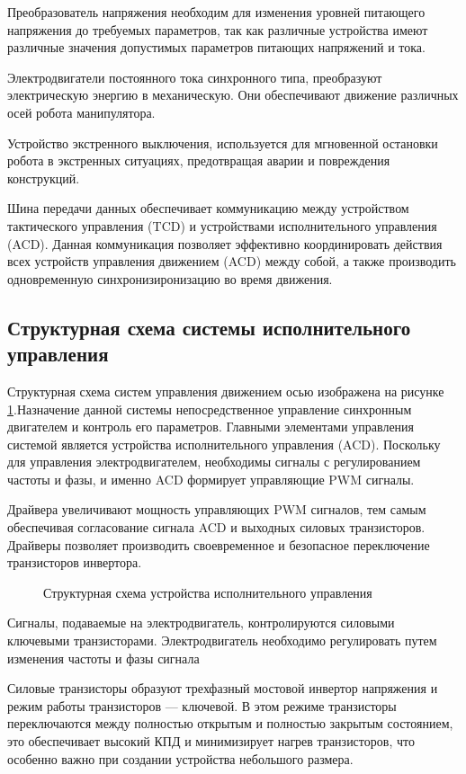 Преобразователь напряжения необходим для изменения уровней питающего напряжения до требуемых параметров, так как различные устройства имеют различные значения допустимых параметров питающих напряжений и тока.

Электродвигатели постоянного тока синхронного типа, преобразуют электрическую энергию в механическую. Они обеспечивают движение различных осей робота манипулятора.

Устройство экстренного выключения, используется для мгновенной остановки робота в экстренных ситуациях, предотвращая аварии и повреждения конструкций.

Шина передачи данных обеспечивает коммуникацию между устройством тактического управления (TCD) и устройствами исполнительного управления (ACD). Данная коммуникация позволяет эффективно координировать действия всех устройств управления движением (ACD) между собой, а также производить одновременную синхронизиронизацию во время движения.

\subsection{Структурная схема системы исполнительного управления}

Структурная схема систем управления движением осью изображена на рисунке \ref{ACD}.Назначение данной системы непосредственное управление синхронным двигателем и контроль его параметров. Главными элементами управления системой является устройства исполнительного управления (ACD). Поскольку для управления электродвигателем, необходимы сигналы с регулированием частоты и фазы, и именно   ACD формирует управляющие PWM сигналы.

Драйвера увеличивают мощность управляющих PWM сигналов, тем самым обеспечивая согласование сигнала ACD и выходных силовых транзисторов. Драйверы позволяет производить своевременное и безопасное переключение транзисторов инвертора. 

\begin{figure}[H]
	\centering
	
	\caption{Структурная схема устройства исполнительного управления}
	\label{ACD}
\end{figure}



Сигналы, подаваемые на электродвигатель, контролируются силовыми ключевыми транзисторами. Электродвигатель необходимо регулировать путем изменения частоты и фазы сигнала

Силовые транзисторы образуют трехфазный мостовой инвертор напряжения и режим работы транзисторов — ключевой. В этом режиме транзисторы переключаются между полностью открытым и полностью закрытым состоянием, это обеспечивает высокий КПД и минимизирует нагрев транзисторов, что особенно важно при создании устройства небольшого размера.

